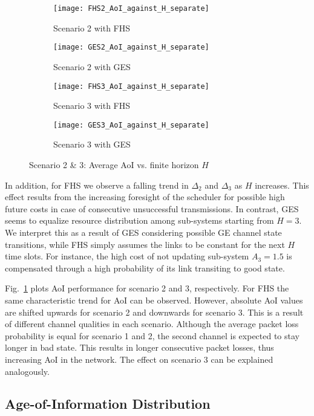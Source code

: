 \begin{figure}[p]
  \centering
  \begin{subfigure}{0.49\textwidth}
    \centering
    \texttt{[image: FHS2\_AoI\_against\_H\_separate]}
    \caption{Scenario 2 with FHS}
  \end{subfigure}
  \hfill
  \begin{subfigure}{0.49\textwidth}
    \centering
    \texttt{[image: GES2\_AoI\_against\_H\_separate]}
    \caption{Scenario 2 with GES}
  \end{subfigure}
  \begin{subfigure}{0.49\textwidth}
    \centering
    \texttt{[image: FHS3\_AoI\_against\_H\_separate]}
    \caption{Scenario 3 with FHS}
  \end{subfigure}
  \hfill
  \begin{subfigure}{0.49\textwidth}
    \centering
    \texttt{[image: GES3\_AoI\_against\_H\_separate]}
    \caption{Scenario 3 with GES}
  \end{subfigure}
  \caption{Scenario 2 \& 3: Average AoI vs. finite horizon $H$}
  \label{fig:AoIseperate2}
\end{figure}

In addition, for FHS we observe a falling trend in $\Delta_2$ and $\Delta_3$ as
$H$ increases. This effect results from the increasing foresight of the
scheduler for possible high future costs in case of consecutive unsuccessful
transmissions. In contrast, GES seems to equalize resource distribution among
sub-systems starting from $H=3$. We interpret this as a result of GES
considering possible GE channel state transitions, while FHS simply assumes the
links to be constant for the next $H$ time slots. For instance, the high cost of
not updating sub-system $A_3=1.5$ is compensated through a high probability of
its link transiting to good state.

Fig.~\ref{fig:AoIseperate2} plots AoI performance for scenario 2 and 3,
respectively. For FHS the same characteristic trend for AoI can be observed.
However, absolute AoI values are shifted upwards for scenario 2 and downwards
for scenario 3. This is a result of different channel qualities in each
scenario. Although the average packet loss probability is equal for scenario 1
and 2, the second channel is expected to stay longer in bad state. This results
in longer consecutive packet losses, thus increasing AoI in the network. The
effect on scenario 3 can be explained analogously.

\subsection{Age-of-Information Distribution}

